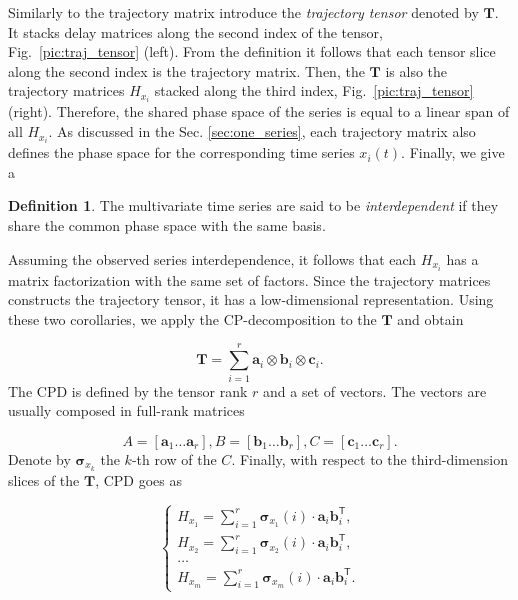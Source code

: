 \documentclass[referee, pdflatex, sn-mathphys-num]{sn-jnl}
\theoremstyle{definition}
\newtheorem{Def}{Definition}
\theoremstyle{plain}
\begin{document}
	Similarly to the trajectory matrix introduce the \textit{trajectory tensor} denoted by $ \mathbf{T} $. It stacks delay matrices along the second index of the tensor, Fig.~\ref{pic:traj_tensor} (left). From the definition it follows that each tensor slice along the second index is the trajectory matrix. Then, the $ \mathbf{T} $ is also the trajectory matrices $ H_{x_i} $ stacked along the third index, Fig.~\ref{pic:traj_tensor} (right). Therefore, the shared phase space of the series is equal to a linear span of all $ H_{x_i} $. As discussed in the Sec. \ref{sec:one_series}, each trajectory matrix also defines the phase space for the corresponding time series $ x_i(t) $. Finally, we give a 
	
	\begin{Def}\label{def:interdepend}	
		The multivariate time series are said to be \emph{interdependent} if they share the common phase space with the same basis.
	\end{Def}
	
	Assuming the observed series interdependence, it follows that each $ H_{x_i} $ has a matrix factorization with the same set of factors. Since the trajectory matrices constructs the trajectory tensor, it has a low-dimensional representation. Using these two corollaries, we apply the CP-decomposition to the $ \mathbf{T} $ and obtain
	
	\begin{equation*}
		\mathbf{T} = \sum\limits_{i = 1}^{r} \mathbf{a}_i \otimes \mathbf{b}_i \otimes \mathbf{c}_i .
	\end{equation*}
	The CPD is defined by the tensor rank $ r $ and a set of vectors. The vectors are usually composed in full-rank matrices 
	
	\begin{equation}\label{eq:cpd_matrices}
		A = [\mathbf{a}_1 \ldots \mathbf{a}_r], B = [\mathbf{b}_1 \ldots \mathbf{b}_r], C = [\mathbf{c}_1 \ldots \mathbf{c}_r] .
	\end{equation}
	Denote by $ \boldsymbol{\sigma}_{x_k} $ the $ k $-th row of the $ C $. Finally, with respect to the third-dimension slices of the $ \mathbf{T} $, CPD goes as
	
	\begin{equation}\label{eq:tSSA_decomp}
		\begin{cases}
			H_{x_1} = \sum\limits_{i = 1}^{r} \boldsymbol{\sigma}_{x_1}(i) \cdot \mathbf{a}_i  \mathbf{b}_i^{\mathsf{T}},  \\
			H_{x_2} = \sum\limits_{i = 1}^{r} \boldsymbol{\sigma}_{x_2}(i) \cdot \mathbf{a}_i  \mathbf{b}_i^{\mathsf{T}}, \\
			\ldots \\
			H_{x_m} = \sum\limits_{i = 1}^{r} \boldsymbol{\sigma}_{x_m}(i) \cdot \mathbf{a}_i  \mathbf{b}_i^{\mathsf{T}} .
		\end{cases}
	\end{equation}
	
\end{document}
